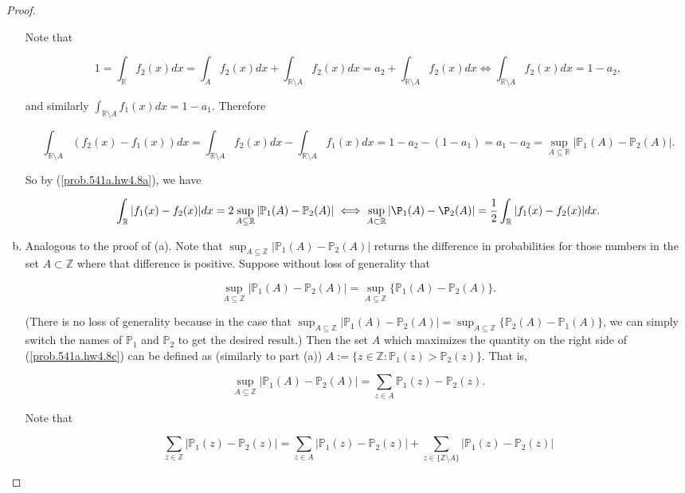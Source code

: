 \begin{proof}
\begin{enumerate}[(a)]
Note that 

\[
1 = \int_{\mathbb{R}} f_2(x) dx =   \int_{A}f_2(x) dx +  \int_{\mathbb{R} \setminus A} f_2(x) dx =   a_2 +  \int_{\mathbb{R} \setminus A} f_2(x) dx \iff  \int_{\mathbb{R} \setminus A} f_2(x) dx = 1 - a_2,
\]

and similarly \( \int_{\mathbb{R} \setminus A} f_1(x) dx = 1 - a_1\). Therefore

\[
 \int_{\mathbb{R} \setminus A}(f_{2}(x)-f_{1}(x))dx  =  \int_{\mathbb{R} \setminus A}f_{2}(x)dx -  \int_{\mathbb{R} \setminus A}f_{1}(x)dx = 1 - a_2 - (1 - a_1) = a_1 - a_2 = \sup_{A\subseteq\mathbb{R}}| \mathbb{P}_{1}(A)-\mathbb{P}_{2}(A)| .
\]

So by (\ref{prob.541a.hw4.8a}), we have

\[
\int_{\mathbb{R}}|f_{1}(x)-f_{2}(x)|dx  = 2  \sup_{A\subseteq\mathbb{R}}| \mathbb{P}_{1}(A)-\mathbb{P}_{2}(A)| \iff  \sup_{A\subset\mathbb{R}}|\P_{1}(A)-\P_{2}(A)|=\frac{1}{2}\int_{\mathbb{R}}|f_{1}(x)-f_{2}(x)|dx.
\]

%
%
\item Analogous to the proof of (a). Note that \(\sup_{A\subseteq\mathbb{Z}}| \mathbb{P}_{1}(A)-\mathbb{P}_{2}(A)|\) returns the difference in probabilities for those numbers in the set \(A \subset \mathbb{Z}\) where that difference is positive. Suppose without loss of generality that 

\begin{equation}\label{prob.541a.hw4.8c}
\sup_{A\subseteq\mathbb{Z}}| \mathbb{P}_{1}(A)-\mathbb{P}_{2}(A)| = \sup_{A\subseteq\mathbb{Z}} \{\mathbb{P}_{1}(A)-\mathbb{P}_{2}(A)\}.
\end{equation}

 (There is no loss of generality because in the case that \(\sup_{A\subseteq\mathbb{Z}}| \mathbb{P}_{1}(A)-\mathbb{P}_{2}(A)| = \sup_{A\subseteq\mathbb{Z}} \{ \mathbb{P}_{2}(A)-\mathbb{P}_{1}(A)\}\), we can simply switch the names of \(\mathbb{P}_1\) and \(\mathbb{P}_2\) to get the desired result.) Then the set \(A\) which maximizes the quantity on the right side of (\ref{prob.541a.hw4.8c}) can be defined as (similarly to part (a)) \(A:=\{z\in\mathbb{Z}: \mathbb{P}_1(z) > \mathbb{P}_{2}(z)\}\). That is,
 
 \[
 \sup_{A\subseteq\mathbb{Z}}| \mathbb{P}_{1}(A)-\mathbb{P}_{2}(A)| =  \sum_{z \in A}\mathbb{P}_1(z) - \mathbb{P}_2(z).
 \]
 
Note that
 
 \[
 \sum_{z \in \mathbb{Z}}|\mathbb{P}_1(z) - \mathbb{P}_2(z)| =  \sum_{z \in A}|\mathbb{P}_{1}(z)-\mathbb{P}_{2}(z)|  +  \sum_{z \in \{\mathbb{Z} \setminus A\}}|\mathbb{P}_{1}(z)-\mathbb{P}_{2}(z)|   
 \]
 

\end{enumerate}
\end{proof}
